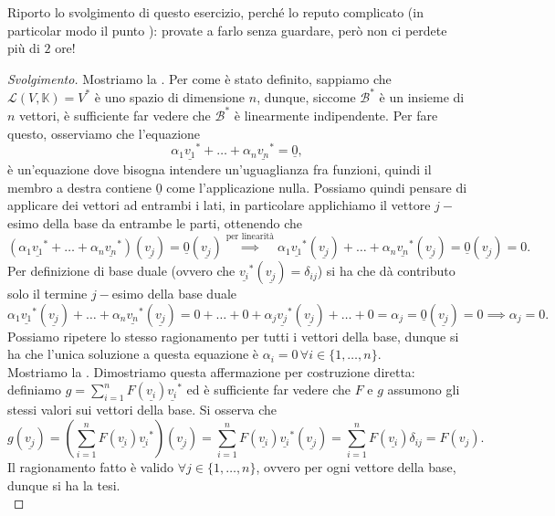 Riporto lo svolgimento di questo esercizio, perché lo reputo complicato (in particolar modo il punto ): provate a farlo senza guardare, però non ci perdete più di $2$ ore!
\begin{proof}[Svolgimento]
    Mostriamo la . Per come è stato definito, sappiamo che $\mathcal{L}(V, \mathbb{K}) = V^\ast$ è uno spazio di dimensione $n$, dunque, siccome $\mathcal{B}^\ast$ è un insieme di $n$ vettori, è sufficiente far vedere che $\mathcal{B}^\ast$ è linearmente indipendente. Per fare questo, osserviamo che l'equazione
    $$
        \alpha_1 \underline{v_1}^\ast + \ldots + \alpha_n \underline{v_n}^\ast = \underline{0},
    $$
    è un'equazione dove bisogna intendere un'uguaglianza fra funzioni, quindi il membro a destra contiene $\underline{0}$ come l'applicazione nulla. Possiamo quindi pensare di applicare dei vettori ad entrambi i lati, in particolare applichiamo il vettore $j-$esimo della base da entrambe le parti, ottenendo che
    $$
        (\alpha_1 \underline{v_1}^\ast + \ldots + \alpha_n \underline{v_n}^\ast)(\underline{v_j}) = \underline{0}(\underline{v_j}) \stackrel{\text{per linearità}}{\implies} \alpha_1 \underline{v_1}^\ast(\underline{v_j}) + \ldots + \alpha_n \underline{v_n}^\ast(\underline{v_j}) = \underline{0}(\underline{v_j}) = 0.
    $$
    Per definizione di base duale (ovvero che $\underline{v_i}^\ast(\underline{v_j}) = \delta_{ij}$) si ha che dà contributo solo il termine $j-$esimo della base duale
    $$
        \alpha_1 \underline{v_1}^\ast(\underline{v_j}) + \ldots + \alpha_n \underline{v_n}^\ast(\underline{v_j}) = 0 + \ldots + 0 + \alpha_j \underline{v_j}^\ast(\underline{v_j}) + \ldots + 0 = \alpha_j = \underline{0}(\underline{v_j}) = 0 \implies \alpha_j = 0.
    $$
    Possiamo ripetere lo stesso ragionamento per tutti i vettori della base, dunque si ha che l'unica soluzione a questa equazione è $\alpha_i = 0 \, \forall i \in \{ 1, \ldots, n\}$. \\
    Mostriamo la . Dimostriamo questa affermazione per costruzione diretta: definiamo $g = \sum\limits_{i=1}^n F(\underline{v_i})\underline{v_i}^*$ ed è sufficiente far vedere che $F$ e $g$ assumono gli stessi valori sui vettori della base. Si osserva che
    $$
        g(\underline{v_j}) = \left( \sum\limits_{i=1}^n F(\underline{v_i})\underline{v_i}^*\right)(\underline{v_j}) = \sum\limits_{i=1}^n F(\underline{v_i})\underline{v_i}^*(\underline{v_j}) = \sum\limits_{i=1}^n F(\underline{v_i})\delta_{ij} = F(v_j).
    $$
    Il ragionamento fatto è valido $\forall j \in \{ 1, \ldots, n\}$, ovvero per ogni vettore della base, dunque si ha la tesi. \\

\end{proof}
